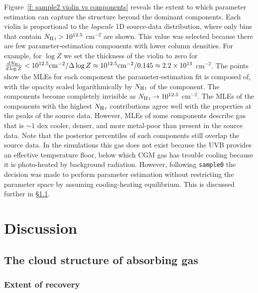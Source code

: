 \documentclass[fleqn,usenatbib]{mnras}
\begin{document}
Figure~\ref{f: sample2 violin vs components} reveals the extent to which parameter estimation can capture the structure beyond the dominant components.
Each violin is proportional to the \textit{logscale} 1D source-data distribution,
where only bins that contain $N_{\ion{H}{I}} > 10^{12.5}$ cm$^{-2}$ are shown.
This value was selected because there are few parameter-estimation components with lower column densities.
For example, for $\log Z$ we set the thickness of the violin to zero for $\frac{dN_{\ion{H}{I}}}{d\log Z} < 10^{12.5} {\rm cm}^{-2} / \Delta \log Z \approx 10^{12.5} {\rm cm}^{-2} / 0.145 \approx 2.2 \times 10^{13}$ cm$^{-2}$.
The points show the MLEs for each component the parameter-estimation fit is composed of,
with the opacity scaled logarithmically by $N_{\ion{H}{I}}$ of the component.
The components become completely invisible as $N_{\ion{H}{I}} \rightarrow 10^{12.5}$ cm$^{-2}$.
The MLEs of the components with the highest $N_{\ion{H}{I}}$ contributions agree well with the properties at the peaks of the source data.
However, MLEs of some components describe gas that is $\sim 1$ dex cooler, denser, and more metal-poor than present in the source data.
Note that the posterior percentiles of such components still overlap the source data.
In the simulations this gas does not exist because the UVB provides an effective temperature floor,
below which CGM gas has trouble cooling because it is photo-heated by background radiation.
However, following \texttt{sample0} the decision was made to perform parameter estimation without restricting the parameter space by assuming cooling-heating equilibrium.
This is discussed further in \S\ref{s: discussion -- cloud structure}.

\section{Discussion}
\label{s: discussion}

\subsection{The cloud structure of absorbing gas}
\label{s: discussion -- cloud structure}

\subsubsection{Extent of recovery}
\label{s: discussion -- cloud structure -- recovery}
\end{document}
